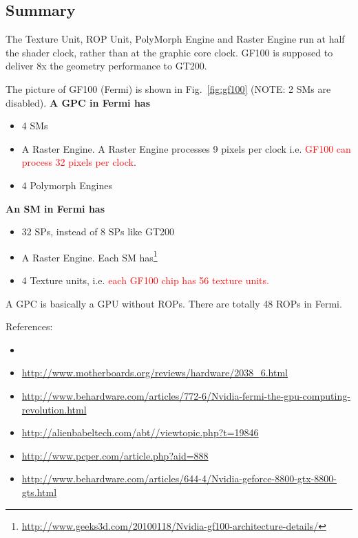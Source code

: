 \subsection{Summary}
\label{sec:summary-CUDA_gpu_arch}


\begin{framed}
  The Texture Unit, ROP Unit, PolyMorph Engine and Raster Engine run
  at half the shader clock, rather than at the graphic core
  clock. GF100 is supposed to deliver 8x the geometry performance to
  GT200.
\end{framed}

The picture of GF100 (Fermi) is shown in Fig.~\ref{fig:gf100} (NOTE: 2
SMs are disabled). {\bf A GPC in Fermi has}
\begin{itemize}
\item 4 SMs
\item A Raster Engine. A Raster Engine processes 9 pixels per clock
  i.e.  \textcolor{red}{GF100 can process 32 pixels per clock}.
\item 4 Polymorph Engines
\end{itemize}

{\bf An SM in Fermi has}
\begin{itemize}
\item  32 SPs, instead of 8 SPs like GT200

\item  A Raster Engine. Each SM
  has\footnote{\url{http://www.geeks3d.com/20100118/Nvidia-gf100-architecture-details/}} 

\item 4 Texture units, i.e.
  \textcolor{red}{each GF100 chip has 56 texture units.}
\end{itemize}

\begin{framed}
  A GPC is basically a GPU without ROPs. There are totally 48 ROPs in
  Fermi. 
\end{framed}


References:
\begin{itemize}
\item \citep{lindholm2008ntu}
\item \url{http://www.motherboards.org/reviews/hardware/2038_6.html}
\item \url{http://www.behardware.com/articles/772-6/Nvidia-fermi-the-gpu-computing-revolution.html}
\item \url{http://alienbabeltech.com/abt//viewtopic.php?t=19846}
\item \url{http://www.pcper.com/article.php?aid=888}
\item \url{http://www.behardware.com/articles/644-4/Nvidia-geforce-8800-gtx-8800-gts.html}
\end{itemize}


